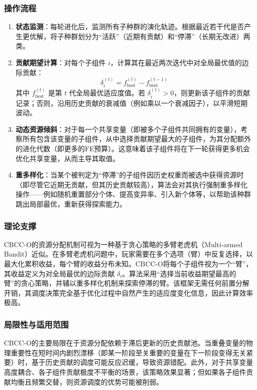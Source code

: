\subsubsection{操作流程}
\begin{enumerate}
    \item \textbf{状态监测}：每轮进化后，监测所有子种群的演化轨迹。根据最近若干代是否产生更优解，将子种群划分为“活跃”（近期有贡献）和“停滞”（长期无改进）两类。
    \item \textbf{贡献期望计算}：对每个子组件 $i$，计算其在最近两次迭代中对全局最优值的边际贡献：
        $$\delta_i^{(t)} = f_{\text{best}}^{(t)} - f_{\text{best}}^{(t-1)}$$
        其中 $f_{\text{best}}^{(t)}$ 是第 $t$ 代全局最优适应度值。若 $\delta_i^{(t)} > 0$，则更新该子组件的贡献记录；否则，沿用历史贡献的衰减值（例如乘以一个衰减因子），以平滑短期波动。
    \item \textbf{动态资源倾斜}：对于每一个共享变量（即被多个子组件共同拥有的变量），考察所有包含该变量的子组件，从中选择贡献期望最大的子组件，为其分配额外的进化代数（即更多的FE预算）。这意味着该子组件将在下一轮获得更多机会优化共享变量，从而主导其取值。
    \item \textbf{重多样化}：当某个被判定为“停滞”的子组件因历史权重而被选中获得资源时（即尽管它近期无贡献，但其历史贡献较高），算法会对其执行强制重多样化操作——例如随机重置部分个体、提高变异率、引入新个体等，以帮助该种群跳出局部最优，重新获得探索能力。
\end{enumerate}

\subsubsection{理论支撑}
CBCC-O的资源分配机制可视为一种基于贪心策略的多臂老虎机（Multi-armed Bandit）近似。在多臂老虎机问题中，玩家需要在多个选项（臂）中反复选择，以最大化累积收益，每个臂的收益分布未知。CBCC-O将每个子组件视为一个“臂”，其收益定义为对全局最优的边际贡献 $\delta_i$。算法采用“选择当前收益期望最高的臂”的贪心策略，并辅以重多样化机制来探索停滞的臂。该框架无需任何前置分解开销，其调度决策完全基于优化过程中自然产生的适应度变化信息，因此计算效率极高。

\subsubsection{局限性与适用范围}
CBCC-O的主要局限在于资源分配依赖于滞后更新的历史贡献池。当重叠变量的物理重要性在短时间内剧烈漂移（即某一阶段至关重要的变量在下一阶段变得无关紧要）时，基于历史贡献的调度可能反应迟缓，导致资源错配。此外，对于共享变量高度耦合、各子组件贡献极度不平衡的场景，该策略效果显著；但如果各子组件贡献均衡且频繁交替，则资源调度的优势可能被削弱。

